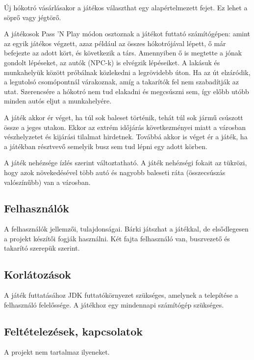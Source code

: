 \par{Új hókotró vásárlásakor a játékos választhat egy alapértelmezett fejet. Ez lehet a söprő vagy jégtörő.}
\par{A játékosok Pass 'N Play módon osztoznak a játékot futtató számítógépen: amint az egyik játékos végzett, azaz például az összes hókotrójával lépett, ő már befejezte az adott kört, és következik a társ. Amennyiben ő is megtette a jónak gondolt lépéseket, az autók (NPC-k) is elvégzik lépéseiket. A lakásuk és munkahelyük között próbálnak közlekedni a legrövidebb úton. Ha az út elzáródik, a legutolsó csomópontnál várakoznak, amíg a takarítók fel nem szabadítják az utat. Szerencsére a hókotró nem tud elakadni és megcsúszni sem, így előbb utóbb minden autós eljut a munkahelyére.}
\par{A játék akkor ér véget, ha túl sok baleset történik, tehát túl sok jármű csúszott össze a jeges utakon. Ekkor az extrém időjárás következményei miatt a városban vészhelyzetet és kijárási tilalmat hirdetnek. Továbbá akkor is véget ér a játék, ha a játékban résztvevő semelyik busz sem tud lépni egy adott körben.}
\par{A játék nehézsége ízlés szerint változtatható. A játék nehézségi fokait az tükrözi, hogy azok növekedésével több autó és nagyobb baleseti ráta (összecsúszás valószínűbb) van a városban. }

\subsection{Felhasználók}
\par{A felhasználók jellemzői, tulajdonságai. Bárki játszhat a játékkal, de elsődlegesen a projekt készítői fogják használni. Két fajta felhasználó van, buszvezető és takarító szerepük szerint. }

\subsection{Korlátozások}
\par{A játék futtatásához JDK futtatókörnyezet szükséges, amelynek a telepítése a felhasználó felelőssége. A játékhoz egy mindennapi számítógép szükséges.}

\subsection{Feltételezések, kapcsolatok}
\par{A projekt nem tartalmaz ilyeneket.}


